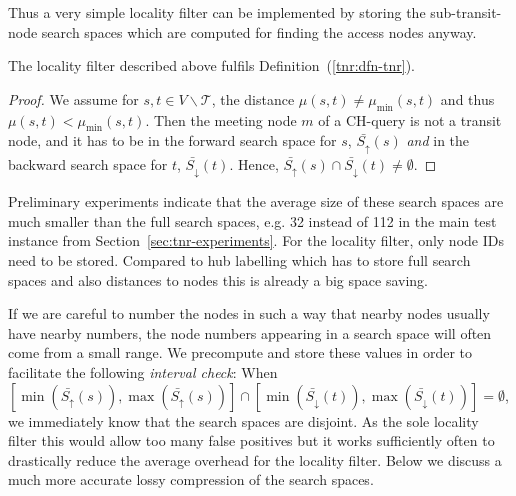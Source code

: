 \documentclass{llncs}
\begin{document}
Thus a very simple locality filter can be implemented by storing the sub-transit-node search spaces which are computed for finding the access nodes anyway. 
\begin{lemma}\label{lem:searchspace}
The locality filter described above fulfils Definition~(\ref{tnr:dfn-tnr}).
\begin{proof}
We assume for $s, t \in V\backslash\mathcal{T}$, the distance $\mu(s, t) \neq \mu_{\min}(s, t)$ and thus $\mu(s, t) < \mu_{\min}(s, t)$. Then the meeting node $m$ of a CH-query is not a transit node, and it has to be in the forward search space for $s$, $\bar{S_\uparrow}(s)$ \emph{and} in the backward search space for $t$, $\bar{S_\downarrow}(t)$. 
Hence, $\bar{S_\uparrow}(s) \cap \bar{S_\downarrow}(t) \neq \emptyset$.
\end{proof}
\end{lemma}
Preliminary experiments indicate that the average size of these search spaces are much smaller than the full search spaces, e.g. 32 instead of 112 in the main test instance from Section~\ref{sec:tnr-experiments}.  For the locality filter, only node IDs need to be stored. Compared to hub labelling which has to store full search spaces and also distances to nodes this is already a big space saving. 

If we are careful to number the nodes in such a way that nearby nodes 
usually have nearby numbers, the node numbers appearing in a search space
will often come from a small range. We precompute and store these values
in order to facilitate the following \emph{interval check}: When
$[\min(\bar{S_\uparrow}(s))  ,\max(\bar{S_\uparrow}(s))]\cap
 [\min(\bar{S_\downarrow}(t)),\max(\bar{S_\downarrow}(t))]=\emptyset$, we 
immediately know that the search spaces are disjoint. As the sole locality filter this would allow too many false positives but it works sufficiently often to drastically reduce the average overhead for the locality filter.
Below we discuss a much more accurate lossy compression of the search spaces.
\end{document}
